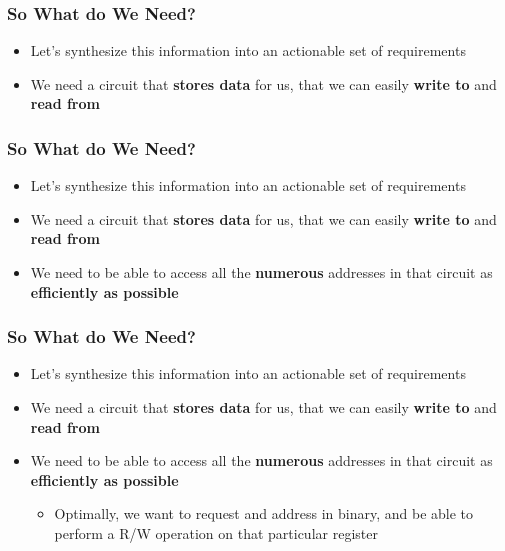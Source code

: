 \documentclass{beamer}
\begin{document}
             \begin{frame}
             	\frametitle{So What do We Need?}
             	\begin{itemize}
             		\item Let's synthesize this information into an actionable set of requirements
             		\item We need a circuit that \textbf{stores data} for us, that we can easily \textbf{write to} and \textbf{read from}
             	\end{itemize}
             \end{frame}
             
             \begin{frame}
             	\frametitle{So What do We Need?}
             	\begin{itemize}
             		\item Let's synthesize this information into an actionable set of requirements
             		\item We need a circuit that \textbf{stores data} for us, that we can easily \textbf{write to} and \textbf{read from}
             		\item We need to be able to access all the \textbf{numerous} addresses in that circuit as \textbf{efficiently as possible}
             	\end{itemize}
             \end{frame}
             
             \begin{frame}
             	\frametitle{So What do We Need?}
             	\begin{itemize}
             		\item Let's synthesize this information into an actionable set of requirements
             		\item We need a circuit that \textbf{stores data} for us, that we can easily \textbf{write to} and \textbf{read from}
             		\item We need to be able to access all the \textbf{numerous} addresses in that circuit as \textbf{efficiently as possible}
             		\begin{itemize}
             			\item Optimally, we want to request and address in binary, and be able to perform a R/W operation on that particular register
             		\end{itemize}
             		
             	\end{itemize}
             \end{frame}
             
\end{document}
